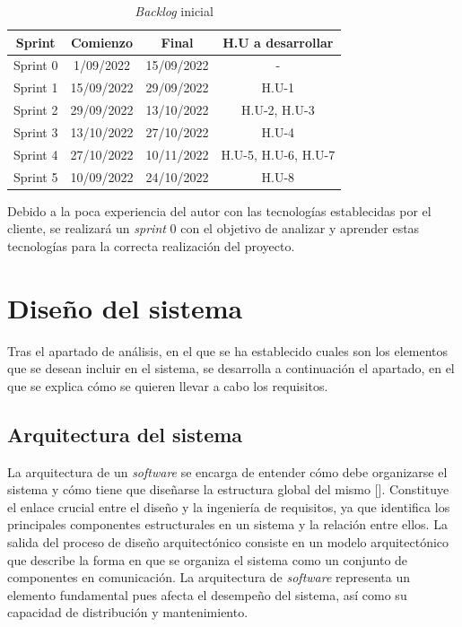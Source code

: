 \begin{table}[!h]
	\begin{center}
		\begin{tabular}{|c|c|c|c|}
		\hline \textbf{Sprint} & \textbf{Comienzo} & \textbf{Final} & \textbf{H.U a desarrollar} \\ 
		\hline Sprint 0 & 1/09/2022  & 15/09/2022 & -\\ 
		\hline Sprint 1 & 15/09/2022 & 29/09/2022 & H.U-1\\ 
		\hline Sprint 2 & 29/09/2022 & 13/10/2022 & H.U-2, H.U-3\\ 
		\hline Sprint 3 & 13/10/2022 & 27/10/2022 & H.U-4\\ 
		\hline Sprint 4 & 27/10/2022 & 10/11/2022 & H.U-5, H.U-6, H.U-7\\ 
		\hline Sprint 5 & 10/09/2022 & 24/10/2022 & H.U-8\\ 
		\hline 
		\end{tabular}
		\caption{\textit{Backlog} inicial}
		\label{tab:sprints}
	\end{center}
\end{table}

Debido a la poca experiencia del autor con las tecnologías establecidas por el cliente, se realizará un \textit{sprint} 0 con el objetivo de analizar y aprender estas tecnologías para la correcta realización del proyecto.

\section{Diseño del sistema}
Tras el apartado de análisis, en el que se ha establecido cuales son los elementos que se desean incluir en el sistema, se desarrolla a continuación el apartado, en el que se explica cómo se quieren llevar a cabo los requisitos.

\subsection{Arquitectura del sistema}
La arquitectura de un \textit{software} se encarga de entender cómo debe organizarse el sistema y cómo tiene que diseñarse la estructura global del mismo [\cite{91}]. Constituye el enlace crucial entre el diseño y la ingeniería de requisitos, ya que identifica los principales componentes estructurales en un sistema y la relación entre ellos. La salida del proceso de diseño arquitectónico consiste en un modelo arquitectónico que describe la  forma en que se organiza el sistema como un conjunto de componentes en comunicación. La arquitectura de \textit{software} representa un elemento fundamental pues afecta el desempeño del sistema, así como su capacidad de distribución y mantenimiento.

